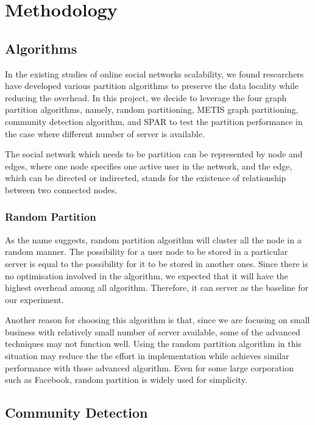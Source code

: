 \section{Methodology}

\subsection{Algorithms}

In the existing studies of online social networks scalability, we found researchers have developed various partition algorithms to preserve the data locality while reducing the overhead. In this project, we decide to leverage the four graph partition algorithms, namely, random partitioning, METIS graph partitioning, community detection algorithm, and SPAR to test the partition performance in the case where different number of server is available.

The social network which needs to be partition can be represented by node and edges, where one node specifies one active user in the network, and the edge, which can be directed or indirected, stands for the existence of relationship between two connected nodes.


\subsubsection{Random Partition}

As the name suggests, random partition algorithm will cluster all the node in a random manner. The possibility for a user node to be stored in a particular server is equal to the possibility for it to be stored in another ones. Since there is no optimisation involved in the algorithm, we expected that it will have the highest overhead among all algorithm. Therefore, it can server as the baseline for our experiment.  

Another reason for choosing this algorithm is that, since we are focusing on small business with relatively small number of server available, some of the advanced techniques may not function well. Using the random partition algorithm in this situation may reduce the the effort in implementation while achieves similar performance with those advanced algorithm. Even for some large corporation such as Facebook, random partition is widely used for simplicity.

\subsection{Community Detection}

